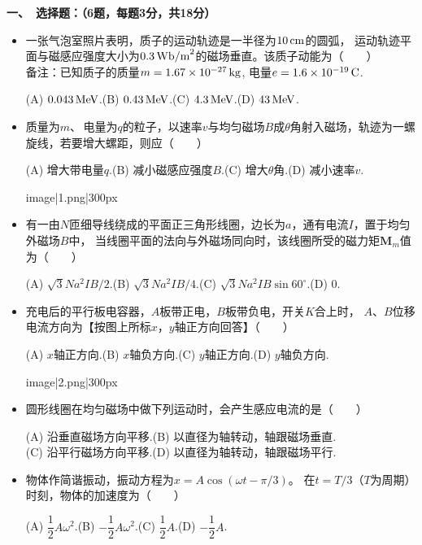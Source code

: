 \textbf{一、\ 选择题：（6题，每题3分，共18分）}
\begin{itemize}
    \item[1、]一张气泡室照片表明，质子的运动轨迹是一半径为$10\,\text{cm}$的圆弧，
    运动轨迹平面与磁感应强度大小为$0.3\,\text{Wb/m}^2$的磁场垂直。该质子动能为（$\qquad$）\\
    备注：已知质子的质量$m = 1.67 \times 10^{-27}\,\text{kg}$, 电量$e = 1.6 \times 10^{-19}\,\text{C}$. 
    \begin{center}
    (A) $0.043\,\text{MeV}$.\quad (B) $0.43\,\text{MeV}$.\quad (C) $4.3\,\text{MeV}$.\quad (D) $43\,\text{MeV}$.
    \end{center}
    \item[2、]质量为$m$、\,电量为$q$的粒子，以速率$v$与均匀磁场$B$成$\theta$角射入磁场，轨迹为一螺旋线，若要增大螺距，则应（$\qquad$）
    \begin{center}
    (A) 增大带电量$q$.\quad (B) 减小磁感应强度$B$.\quad (C) 增大$\theta$角.\quad (D) 减小速率$v$.
    \end{center}
    \begin{center}
        {{image|1.png|300px}}
    \end{center}
    \item[3、]有一由$N$匝细导线绕成的平面正三角形线圈，边长为$a$，通有电流$I$，置于均匀外磁场$B$中，
    当线圈平面的法向与外磁场同向时，该线圈所受的磁力矩$\boldsymbol{M}_{\!m}$值为（$\qquad$）
    \begin{center}
    (A) $\sqrt{3}Na^2IB/2$.\quad (B) $\sqrt{3}Na^2IB/4$.\quad (C) $\sqrt{3}Na^2IB\sin60^{\circ}$.\quad (D) $0$.
    \end{center}
    \item[4、]充电后的平行板电容器，$A$板带正电，$B$板带负电，开关$K$合上时，
    $A$、$B$位移电流方向为【按图上所标$x$，$y$轴正方向回答】（$\qquad$）
    \begin{center}
    (A) $x$轴正方向.\quad (B) $x$轴负方向.\quad (C) $y$轴正方向.\quad (D) $y$轴负方向.
    \end{center}
    \begin{center}
        {{image|2.png|300px}}
    \end{center}
    \item[5、]圆形线圈在均匀磁场中做下列运动时，会产生感应电流的是（$\qquad$）
    \begin{center}
    (A) 沿垂直磁场方向平移.\quad (B) 以直径为轴转动，轴跟磁场垂直.\\
    (C) 沿平行磁场方向平移.\quad (D) 以直径为轴转动，轴跟磁场平行.
    \end{center}
    \item[6、]物体作简谐振动，振动方程为$x = A \cos(\omega t-\pi/3)$。
    在$t = T/3$（$T$为周期）时刻，物体的加速度为（$\qquad$）
    \begin{center}
    (A) $\dfrac{1}{2}A\omega^2$.\quad (B) $-\dfrac{1}{2}A\omega^2$.\quad (C) $\dfrac{1}{2}A$.\quad (D) $-\dfrac{1}{2}A$.
    \end{center}
\end{itemize}
